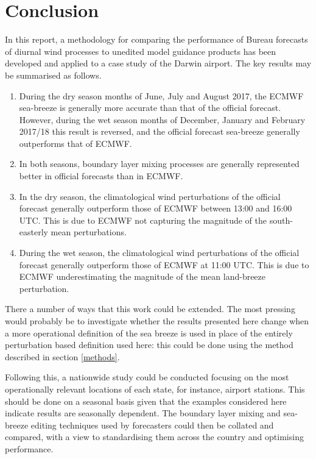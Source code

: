 \documentclass[alpha-refs]{wiley-article}
\begin{document}
\section{Conclusion}
\label{conclusion}
In this report, a methodology for comparing the performance of Bureau forecasts of diurnal wind processes to unedited model guidance products has been developed and applied to a case study of the Darwin airport. The key results may be summarised as follows.
\begin{enumerate}
\item
During the dry season months of June, July and August 2017, the ECMWF sea-breeze is generally more accurate than that of the official forecast. However, during the wet season months of December, January and February 2017/18 this result is reversed, and the official forecast sea-breeze generally outperforms that of ECMWF. 
\item
In both seasons, boundary layer mixing processes are generally represented better in official forecasts than in ECMWF.
\item
In the dry season, the climatological wind perturbations of the official forecast generally outperform those of ECMWF between 13:00 and 16:00 UTC. This is due to ECMWF not capturing the magnitude of the south-easterly mean perturbations. 
\item
During the wet season, the climatological wind perturbations of the official forecast generally outperform those of ECMWF at 11:00 UTC. This is due to ECMWF underestimating the magnitude of the mean land-breeze perturbation.
\end{enumerate}    

There a number of ways that this work could be extended. The most pressing would probably be to investigate whether the results presented here change when a more operational definition of the sea breeze is used in place of the entirely perturbation based definition used here: this could be done using the method described in section \ref{methods}.

Following this, a nationwide study could be conducted focusing on the most operationally relevant locations of each state, for instance, airport stations. This should be done on a seasonal basis given that the examples considered here indicate results are seasonally dependent. The boundary layer mixing and sea-breeze editing techniques used by forecasters could then be collated and compared, with a view to standardising them across the country and optimising performance.


\end{document}
